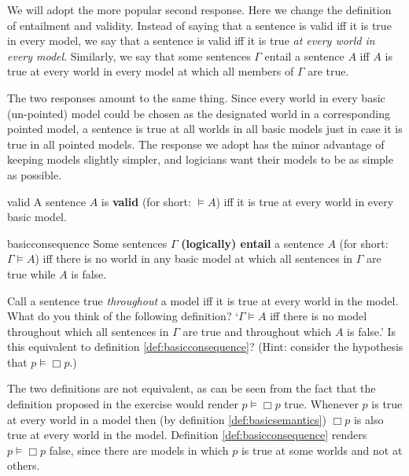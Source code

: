 We will adopt the more popular second response. Here we change the definition of
entailment and validity. Instead of saying that a sentence is valid iff it is
true in every model, we say that a sentence is valid iff it is true \emph{at
  every world in every model}. Similarly, we say that some sentences $\Gamma$
entail a sentence $A$ iff $A$ is true at every world in every model at which all
members of $\Gamma$ are true.

The two responses amount to the same thing. Since every world in every basic
(un-pointed) model could be chosen as the designated world in a corresponding
pointed model, a sentence is true at all worlds in all basic models just in case
it is true in all pointed models. The response we adopt has the minor advantage
of keeping models slightly simpler, and logicians want their models to be as
simple as possible.

\begin{definition}{}{valid}
  A sentence $A$ is \textbf{valid} (for short: $\models A$) iff
  it is true at every world in every basic model.
\end{definition}
%
\begin{definition}{}{basicconsequence}
  Some sentences $\Gamma$ \textbf{(logically) entail} a sentence $A$ (for short:
  $\Gamma \models A$) iff there is no world in any basic model at which all sentences in $\Gamma$ are true while $A$ is false.
\end{definition}

\begin{exercise}
  Call a sentence true \emph{throughout} a model iff it is true at every world
  in the model. What do you think of the following definition?
  `$\Gamma \models A$ iff there is no model throughout which all sentences in 
  $\Gamma$ are true and throughout which $A$ is false.' Is this equivalent to
  definition \ref{def:basicconsequence}? (Hint: consider the hypothesis that
  $p \models \Box p$.)
\end{exercise}
\begin{solution}
  The two definitions are not equivalent, as can be seen from the fact that the
  definition proposed in the exercise would render $p \models \Box p$ true.
  Whenever $p$ is true at every world in a model then (by definition
  \ref{def:basicsemantics}) $\Box p$ is also true at every world in the model.
  Definition \ref{def:basicconsequence} renders $p \models \Box p$ false, since
  there are models in which $p$ is true at some worlds and not at others.
\end{solution}

